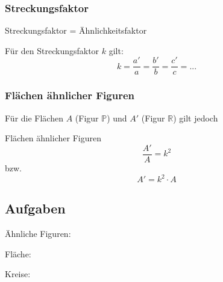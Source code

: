 \subsubsection{Streckungsfaktor}
\begin{gesetz}{Streckungsfaktor
    = Ähnlichkeitsfaktor}{}

  Für den Streckungsfaktor $k$ gilt:
  $$k = \frac{a'}{a} = \frac{b'}{b} = \frac{c'}{c} = ...$$
\end{gesetz}

\newpage

\subsubsection{Flächen ähnlicher Figuren}
Für die Flächen $A$ (Figur $\mathbb{P}$) und $A'$ (Figur $\mathbb{R}$) gilt jedoch

\begin{gesetz}{Flächen ähnlicher Figuren}{}
  $$\frac{A'}{A} = k^2$$
  bzw.
  $$A' = k^2 \cdot{} A$$
\end{gesetz}


\subsection*{Aufgaben}

Ähnliche Figuren:

Fläche:

Kreise:





